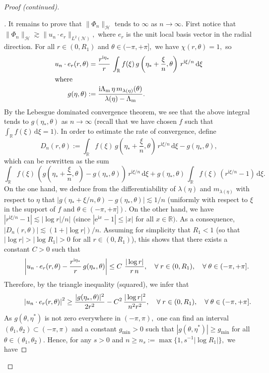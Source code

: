 \documentclass[10pt]{amsart}
\theoremstyle{definition}
\newenvironment{proofc}{\begin{proof}[Proof (continued)]}{\end{proof}}
\newcommand{\calH}{\mathcal{H}}
\newcommand{\calN}{\mathcal{N}}
\newcommand{\bbR}{\mathbb{R}}
\newcommand{\rmd}{{\mathrm{d}}}
\newcommand{\rme}{{\mathrm{e}}}
\newcommand{\rmi}{{\mathrm{i}}}
\newcommand{\Lm}{{\Lambda_{\mathrm{m}}}}
\newcounter{stepcount}
\renewcommand{\thestepcount}{\roman{stepcount}}
\newenvironment{step}{\refstepcounter{stepcount}\begin{proof}[\thestepcount]}{\let\qed\relax\end{proof}}
\let\oldforall\forall
\renewcommand*{\forall}{\mathrel{\oldforall}}
\begin{document}
\begin{proofc}
\begin{step}\label{listproofprop3.7.4}
It remains to prove that $\| \Phi_n \|_\calH$ tends to $\infty$ as $n \to \infty$. First notice that $\| \Phi_n \|_\calH \gtrsim \| u_n\cdot e_r \|_{L^2(\calN)},$ where $e_r$ is the unit local basis vector in the radial direction. For all $r \in (0,R_1)$ and $\theta \in (-\pi,+\pi],$ we have $\chi(r,\theta) = 1,$ so
\begin{align*}
u_n\cdot e_r(r,\theta) =&\;\frac{r^{\rmi\eta_*}}{r}\,
\int_{\bbR} f(\xi)\, g\left(\eta_* + \frac{\xi}{n},\theta\right)\,r^{\rmi\xi/n} \,\rmd \xi\\
\intertext{where}
 g(\eta,\theta) :=&\;\frac{\rmi\Lm\,\eta\,m_{\lambda(\eta)}(\theta)}{\lambda(\eta)-\Lm}.
\end{align*}
By the Lebesgue dominated convergence theorem, we see that the above integral tends to $g(\eta_*,\theta)$ as $n \to \infty$ (recall that we have chosen $f$ such that $\int_{\bbR} f(\xi) \,\rmd \xi = 1).$ In order to estimate the rate of convergence, define
\[
D_n(r,\theta) := \int_{\bbR} f(\xi)\, g\left(\eta_* + \frac{\xi}{n},\theta\right)
\,r^{\rmi\xi/n} \,\rmd \xi - g(\eta_*,\theta),
\]
which can be rewritten as the sum
\[
\int_{\bbR} f(\xi)\, \left(g\left(\eta_* + \frac{\xi}{n},\theta\right) - g(\eta_*,\theta)\right)\,r^{\rmi\xi/n} \,\rmd \xi + g(\eta_*,\theta)\,\int_{\bbR} f(\xi)\, \left(r^{\rmi\xi/n} - 1 \right) \,\rmd \xi.
\]
On the one hand, we deduce from the differentiability of $\lambda(\eta)$ and $m_{\lambda(\eta)}$ with respect to $\eta$ that $| g(\eta_* + \xi/n,\theta) - g(\eta_*,\theta)| \lesssim 1/n$ (uniformly with respect to $\xi$ in the support of $f$ and $\theta \in (-\pi,+\pi]).$ On the other hand, we have $|r^{\rmi\xi/n} - 1| \lesssim |\log r|/n|$ (since $|\rme^{\rmi x} - 1| \leq |x|$ for all $x \in \bbR).$ As a consequence, $|D_n(r,\theta)| \lesssim (1 +|\log r|)/n.$ Assuming for simplicity that $R_1 < 1$ (so that $|\log r| > |\log R_1| > 0$ for all $r \in (0,R_1)$), this shows that there exists a constant $C>0$ such that
\[
\mkern40mu\left| u_n\cdot e_r(r,\theta) - \frac{r^{\rmi\eta_*}}{r}\, g(\eta_*,\theta) \right|
\leq C\ \frac{|\log r|}{r\,n},
\quad \forall r \in (0,R_1), \quad \forall \theta \in (-\pi,+\pi].
\]
Therefore, by the triangle inequality (squared), we infer that
\[
\mkern45mu\left| u_n\cdot e_r(r,\theta) \right|^2
\geq \frac{|g(\eta_*,\theta)|^2}{2r^2} - C^2\,\frac{|\log r|^2}{n^2r^2},
\quad \forall r \in (0,R_1), \quad \forall \theta \in (-\pi,+\pi].
\]
As $g(\theta,\eta^*)$ is not zero everywhere in $(-\pi,\pi),$ one can find an interval $(\theta_1,\theta_2) \subset (-\pi,\pi)$ and a constant $g_{\min} > 0$ such that $|g(\theta,\eta^*)| \geq g_{\min}$ for all $\theta \in (\theta_1,\theta_2).$ Hence, for any $s > 0$ and $n \geq n_s := \max\big\{1,s^{-1}|\log R_1|\big\},$ we have

\end{step}
\end{proofc}
\end{document}
